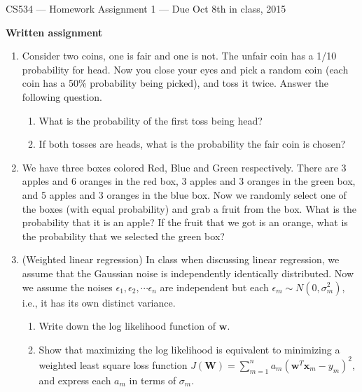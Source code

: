 \documentclass{article}
\begin{document}
{\Large
\begin{center}
CS534 --- Homework Assignment 1 --- {Due Oct 8th in class, 2015}
\end{center}
}

\noindent
{\Large
\textbf{Written assignment
}}
\begin{enumerate}
\item Consider two coins, one is fair and one is not. The unfair coin has a 1/10 probability for head. Now you close your eyes and pick a random coin (each coin has a 50\% probability being picked), and toss it twice. Answer the following question.
    \begin{enumerate}
    \item What is the probability of the first toss being head?
    \item If both tosses are heads, what is the probability the fair coin is chosen?
    \end{enumerate}

\item We have three boxes colored Red, Blue and Green respectively. There are 3 apples and 6 oranges in the red box, 3 apples and 3 oranges in the green box, and 5 apples and 3 oranges in the blue box. Now we randomly select one of the boxes (with equal probability) and grab a fruit from the box. What is the probability that it is an apple? If the fruit that we got is an orange, what is the probability that we selected the green box?


\item (Weighted linear regression) In class when discussing linear regression, we assume that the Gaussian noise is independently identically distributed. Now we assume the noises $\epsilon_1, \epsilon_2, \cdots \epsilon_n$ are independent but each $\epsilon_m \sim N(0, \sigma_m^2)$, i.e., it has its own distinct variance.

     \begin{enumerate}
     \item Write down the log likelihood function of $\mathbf{w}$.

     \item Show that maximizing the log likelihood is equivalent to minimizing a weighted least square loss function $J(\mathbf{W}) = \sum_{m=1}^n a_m(\mathbf{w}^T\mathbf{x}_m-y_m)^2$, and express each $a_m$ in terms of $\sigma_m$.\\


\end{enumerate}
\end{enumerate}
\end{document}
